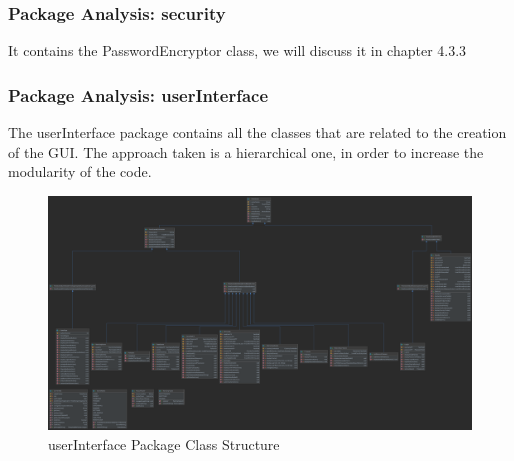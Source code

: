 \subsubsection{Package Analysis: security}
It contains the PasswordEncryptor class, we will discuss it in chapter 4.3.3


\subsubsection{Package Analysis: userInterface}
The userInterface package contains all the classes that are related to the creation of the GUI. The approach taken is a hierarchical one, in order to increase the modularity of the code.  
\begin{figure}[H]
	\centering
	\includegraphics[width=\textwidth]{img/userInterface_package.png}
	\caption{userInterface Package Class Structure}
\end{figure}
